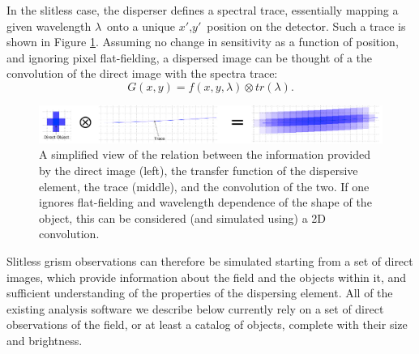 \documentclass[preprint]{aastex}
\begin{document}
In the slitless case, the disperser defines a spectral trace, essentially mapping a given wavelength $\lambda$\ onto a unique $x'$,$y'$\ position on the detector. Such a trace is shown in Figure \ref{fig:1}. Assuming no change in sensitivity as a function of position, and ignoring pixel flat-fielding, a dispersed image can be thought of a the convolution of the direct image with the spectra trace:
\begin{dmath}
G(x,y) =  f(x,y,\lambda) \otimes tr(\lambda).
\end{dmath}

\begin{figure}[!ht]
\centering
\includegraphics[width=\textwidth]{"Figures/Grism_Equation"}
\caption{A simplified view of the relation between the information provided by the direct image (left), the transfer function of the dispersive element, the trace (middle), and the convolution of the two. If one ignores flat-fielding and wavelength dependence of the shape of the object, this can be considered (and simulated using) a 2D convolution.}
\label{fig:1}
\end{figure}

Slitless grism observations can therefore be simulated starting from a set of direct images, which provide information about the field and the objects within it, and sufficient understanding of the properties of the dispersing element.
All of the existing analysis software we describe below currently rely on a set of direct observations of the field, or at least a catalog of objects, complete with their size and brightness. 
\end{document}

